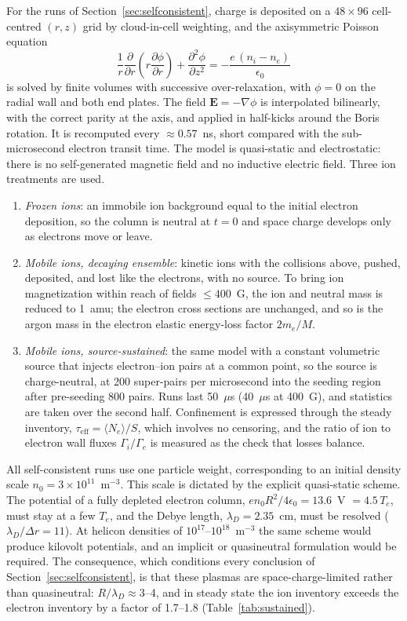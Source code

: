\documentclass[11pt]{article}
\newcommand{\us}{\ensuremath{\mu}s}
\begin{document}
For the runs of Section~\ref{sec:selfconsistent}, charge is deposited on a $48\times96$ cell-centred $(r,z)$ grid by cloud-in-cell weighting, and the axisymmetric Poisson equation
\begin{equation}
\frac{1}{r}\frac{\partial}{\partial r}\left(r\frac{\partial\phi}{\partial r}\right) + \frac{\partial^2\phi}{\partial z^2} = -\frac{e\,(n_i - n_e)}{\epsilon_0}
\end{equation}
is solved by finite volumes with successive over-relaxation, with $\phi = 0$ on the radial wall and both end plates. The field $\mathbf{E} = -\nabla\phi$ is interpolated bilinearly, with the correct parity at the axis, and applied in half-kicks around the Boris rotation. It is recomputed every $\approx 0.57$~ns, short compared with the sub-microsecond electron transit time. The model is quasi-static and electrostatic: there is no self-generated magnetic field and no inductive electric field. Three ion treatments are used.
\begin{enumerate}
  \item \emph{Frozen ions}: an immobile ion background equal to the initial electron deposition, so the column is neutral at $t = 0$ and space charge develops only as electrons move or leave.
  \item \emph{Mobile ions, decaying ensemble}: kinetic ions with the collisions above, pushed, deposited, and lost like the electrons, with no source. To bring ion magnetization within reach of fields $\le 400$~G, the ion and neutral mass is reduced to 1~amu; the electron cross sections are unchanged, and so is the argon mass in the electron elastic energy-loss factor $2m_e/M$.
  \item \emph{Mobile ions, source-sustained}: the same model with a constant volumetric source that injects electron--ion pairs at a common point, so the source is charge-neutral, at 200 super-pairs per microsecond into the seeding region after pre-seeding 800 pairs. Runs last 50~\us{} (40~\us{} at 400~G), and statistics are taken over the second half. Confinement is expressed through the steady inventory, $\tau_{\mathrm{eff}} = \langle N_e\rangle/S$, which involves no censoring, and the ratio of ion to electron wall fluxes $\Gamma_i/\Gamma_e$ is measured as the check that losses balance.
\end{enumerate}

All self-consistent runs use one particle weight, corresponding to an initial density scale $n_0 = 3\times10^{11}$~m$^{-3}$. This scale is dictated by the explicit quasi-static scheme. The potential of a fully depleted electron column, $e n_0 R^2/4\epsilon_0 = 13.6$~V $= 4.5\,T_e$, must stay at a few $T_e$, and the Debye length, $\lambda_D = 2.35$~cm, must be resolved ($\lambda_D/\Delta r = 11$). At helicon densities of $10^{17}$--$10^{18}$~m$^{-3}$ the same scheme would produce kilovolt potentials, and an implicit or quasineutral formulation would be required. The consequence, which conditions every conclusion of Section~\ref{sec:selfconsistent}, is that these plasmas are space-charge-limited rather than quasineutral: $R/\lambda_D \approx 3$--4, and in steady state the ion inventory exceeds the electron inventory by a factor of 1.7--1.8 (Table~\ref{tab:sustained}).
\end{document}
